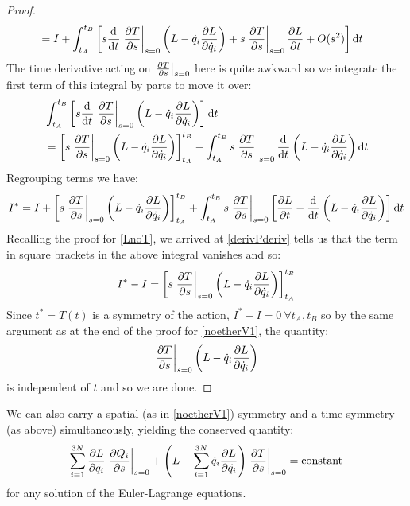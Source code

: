 \documentclass[../main.tex]{subfiles}
\begin{document}
\begin{proof}
\begin{align*}
         &= I + \int_{t_{A}}^{t_{B}} \left[s \deriv{}{t} \at{\pderiv{T}{s}}{s = 0}\left(L -\dot{q}_i \pderiv{L}{\dot{q}_i}\right) + s \at{\pderiv{T}{s}}{s = 0}\pderiv{L}{t} + O(s^2)\right] \d{t}
  \end{align*}
  The time derivative acting on $\at{\pderiv{T}{s}}{s = 0}$ here is quite awkward so we integrate the first term of this integral by parts to move it over:
  \begin{align*}
    &\int_{t_{A}}^{t_{B}} \left[s \deriv{}{t} \at{\pderiv{T}{s}}{s = 0}\left(L - \dot{q}_i \pderiv{L}{\dot{q}_i}\right)\right] \d{t} \\
    &= \eval{s \at{\pderiv{T}{s}}{s = 0}\left(L - \dot{q}_i \pderiv{L}{\dot{q}_i}\right)}{t_A}{t_B} - \int_{t_A}^{t_B} s \at{\pderiv{T}{s}}{s = 0}\deriv{}{t}\left(L - \dot{q}_i \pderiv{L}{\dot{q}_i}\right) \d{t}
  \end{align*}
  Regrouping terms we have:
  \[
    I^{*} = I + \eval{s \at{\pderiv{T}{s}}{s = 0}\left(L - \dot{q}_i \pderiv{L}{\dot{q}_i}\right)}{t_A}{t_B} + \int_{t_A}^{t_B} s \at{\pderiv{T}{s}}{s = 0}\left[\pderiv{L}{t} - \deriv{}{t}\left(L - \dot{q}_i \pderiv{L}{\dot{q}_i}\right)\right] \d{t}
  \]
  Recalling the proof for \cref{LnoT}, we arrived at \cref{derivPderiv} tells us that the term in square brackets in the above integral vanishes and so:
  \[
    I^{*} - I = \eval{s \at{\pderiv{T}{s}}{s = 0}\left(L - \dot{q}_i \pderiv{L}{\dot{q}_i}\right)}{t_A}{t_B}
  \]
  Since $t^{*} = T(t)$ is a symmetry of the action, $I^{*} - I = 0\ \forall t_A, t_B$ so by the same argument as at the end of the proof for \cref{noetherV1}, the quantity:
  \[
    \at{\pderiv{T}{s}}{s = 0}\left(L - \dot{q}_i \pderiv{L}{\dot{q}_i}\right)
  \]
  is independent of $t$ and so we are done.
\end{proof}
\begin{remark}
  We can also carry a spatial (as in \cref{noetherV1}) symmetry and a time symmetry (as above) simultaneously, yielding the conserved quantity:
  \[
    \sum_{i = 1}^{3N} \pderiv{L}{\dot{q}_i} \at{\pderiv{Q_i}{s}}{s = 0} + \left(L - \sum_{i = 1}^{3N} \dot{q}_i \pderiv{L}{\dot{q_i}}\right)\at{\pderiv{T}{s}}{s = 0} = \text{constant}
  \]
  for any solution of the Euler-Lagrange equations.
\end{remark}
\end{document}
